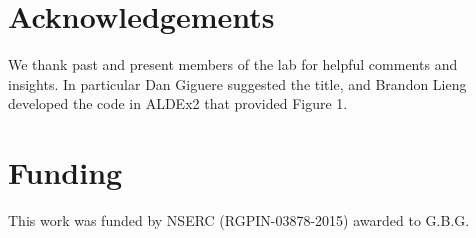\documentclass[fleqn,10pt,lineno]{wlpeerj}
\begin{document}
\section*{Acknowledgements}

We thank past and present members of the lab for helpful comments and insights. In particular Dan Giguere suggested the title, and Brandon Lieng developed the code in ALDEx2 that provided Figure 1.

\vspace{-12pt}
\section*{Funding}

This work was funded by NSERC (RGPIN-03878-2015) awarded to G.B.G.\vspace*{-12pt}
\end{document}
